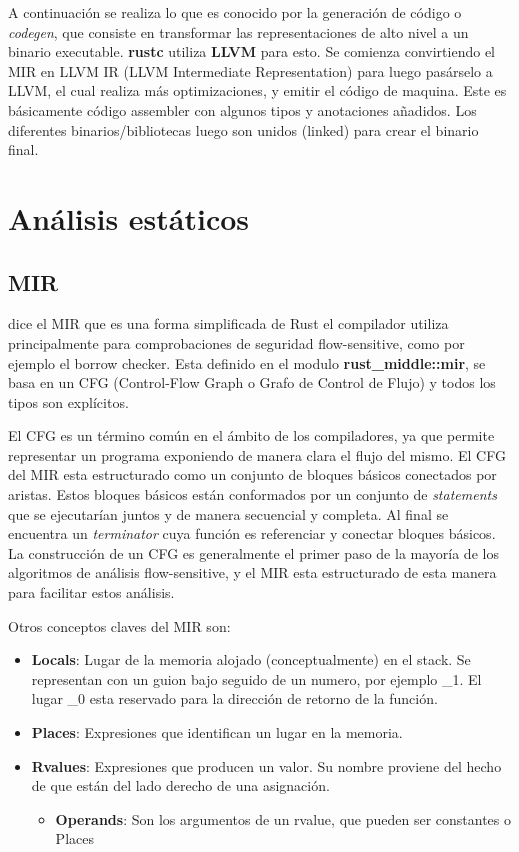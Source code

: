A continuación se realiza lo que es conocido por la generación de código o \textit{codegen}, que consiste en transformar las representaciones de alto nivel a un binario executable. \textbf{rustc} utiliza \textbf{LLVM} para esto. Se comienza convirtiendo el MIR en LLVM IR (LLVM Intermediate Representation) para luego pasárselo a LLVM, el cual realiza más optimizaciones, y emitir el código de maquina. Este es básicamente código assembler con algunos tipos y anotaciones añadidos. Los diferentes binarios/bibliotecas luego son unidos (linked) para crear el binario final.

\section{Análisis estáticos}

\subsection{MIR}

\cite{rustcdevelopment} dice el MIR que es una forma simplificada de Rust el compilador utiliza principalmente para comprobaciones de seguridad flow-sensitive, como por ejemplo el borrow checker. Esta definido en el modulo \textbf{rust\_middle::mir}, se basa en un CFG (Control-Flow Graph o Grafo de Control de Flujo) y todos los tipos son explícitos.

El CFG es un término común en el ámbito de los compiladores, ya que permite representar un programa exponiendo de manera clara el flujo del mismo. El CFG del MIR esta estructurado como un conjunto de bloques básicos conectados por aristas. Estos bloques básicos están conformados por un conjunto de \textit{statements} que se ejecutarían juntos y de manera secuencial y completa. Al final se encuentra un \textit{terminator} cuya función es referenciar y conectar bloques básicos. La construcción de un CFG es generalmente el primer paso de la mayoría de los algoritmos de análisis flow-sensitive, y el MIR esta estructurado de esta manera para facilitar estos análisis.

Otros conceptos claves del MIR son:
\begin{itemize}
    \item \textbf{Locals}: Lugar de la memoria alojado (conceptualmente) en el stack. Se representan con un guion bajo seguido de un numero, por ejemplo \_1. El lugar \_0 esta reservado para la dirección de retorno de la función.
    \item \textbf{Places}: Expresiones que identifican un lugar en la memoria.
    \item \textbf{Rvalues}: Expresiones que producen un valor. Su nombre proviene del hecho de que están del lado derecho de una asignación.
    \begin{itemize}
        \item \textbf{Operands}: Son los argumentos de un rvalue, que pueden ser constantes o Places
    \end{itemize}
\end{itemize}

